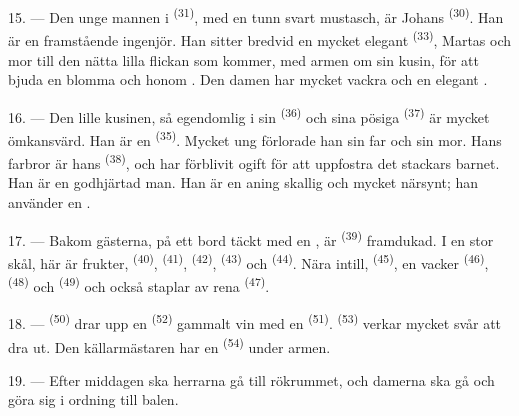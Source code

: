 15. --- Den unge mannen i  \textsuperscript{(31)}, med en tunn svart mustasch,
är Johans  \textsuperscript{(30)}. Han är en framstående ingenjör. Han sitter
bredvid en mycket elegant  \textsuperscript{(33)}, Martas
 och mor till den nätta lilla flickan som kommer, med armen om sin kusin,
för att bjuda en blomma och
 honom . Den damen har mycket vackra
 och en elegant .

16. --- Den lille kusinen, så egendomlig i sin  \textsuperscript{(36)} och sina
pösiga  \textsuperscript{(37)} är mycket ömkansvärd. Han är en
 \textsuperscript{(35)}. Mycket ung förlorade han sin far och sin mor.
Hans farbror är hans  \textsuperscript{(38)}, och har förblivit ogift för
att uppfostra det stackars barnet. Han är en godhjärtad man. Han är en aning skallig och
mycket närsynt; han använder en .

\VUsaut{2.4mm}
\VUsaut{3.0mm}

17. --- Bakom gästerna, på ett bord täckt med en , är
 \textsuperscript{(39)} framdukad. I en stor skål, här är
frukter,  \textsuperscript{(40)},  \textsuperscript{(41)},
 \textsuperscript{(42)},
 \textsuperscript{(43)} och 
\textsuperscript{(44)}. Nära intill,  \textsuperscript{(45)}, en vacker
 \textsuperscript{(46)},
 \textsuperscript{(48)} och 
\textsuperscript{(49)} och också staplar av rena  \textsuperscript{(47)}.

18. ---  \textsuperscript{(50)} drar upp en 
\textsuperscript{(52)} gammalt vin med en  \textsuperscript{(51)}.
 \textsuperscript{(53)} verkar mycket svår att dra ut. Den källarmästaren har
en  \textsuperscript{(54)} under armen.

19. --- Efter middagen ska herrarna gå till rökrummet, och damerna ska gå och göra sig i
ordning till balen.

\VUsaut{5.0mm}
\VUsaut{1.6mm}
\VUsaut{2.6mm}


